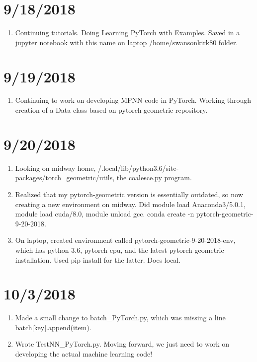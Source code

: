 \documentclass[12pt,reqno]{amsart}
\numberwithin{equation}{section}
\begin{document}
\section{9/18/2018}
\begin{enumerate}
\item Continuing tutorials.  Doing Learning PyTorch with Examples.  Saved in a jupyter notebook with this name on laptop /home/swansonkirk80 folder.  
\end{enumerate}

\section{9/19/2018}
\begin{enumerate}
\item Continuing to work on developing MPNN code in PyTorch.  Working through creation of a Data class based on pytorch geometric repository.
\end{enumerate}

\section{9/20/2018}
\begin{enumerate}
\item Looking on midway home, /.local/lib/python3.6/site-packages/torch\_geometric/utils, the coalesce.py program.  
\item Realized that my pytorch-geometric version is essentially outdated, so now creating a new environment on midway.  Did module load Anaconda3/5.0.1, module load cuda/8.0, module unload gcc.  conda create -n pytorch-geometric-9-20-2018.  
\item On laptop, created environment called pytorch-geometric-9-20-2018-env, which has python 3.6, pytorch-cpu, and the latest pytorch-geometric installation.  Used pip install for the latter.  Does local.  
\end{enumerate}

\section{10/3/2018}
\begin{enumerate}
\item Made a small change to batch\_PyTorch.py, which was missing a line batch[key].append(item).  
\item Wrote TestNN\_PyTorch.py.  Moving forward, we just need to work on developing the actual machine learning code!
\end{enumerate}



\normalsize

\end{document}
